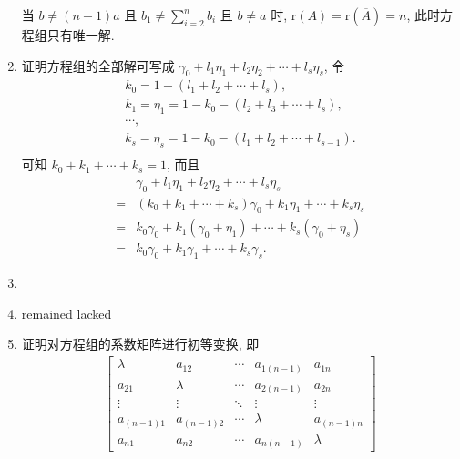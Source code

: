 \documentclass[a4paper, 11pt]{ctexart}
\newcommand{\rank}{\mathrm{r}}
\begin{document}
\begin{enumerate}
        当 $b \ne (n-1)a$ 且 $b_1 \ne \sum_{i=2}^nb_i$ 且 $b \ne a$ 时, $\rank(A) = \rank(\overline{A}) = n$, 此时方程组只有唯一解.
    \item %
        {\heiti 证明}\quad 方程组的全部解可写成 $\gamma_0 + l_1\eta_1 + l_2\eta_2 + \cdots + l_s\eta_s$, 令
        \begin{gather*}
            k_0 = 1 - (l_1 + l_2 + \cdots + l_s), \\
            k_1 = \eta_1 = 1 - k_0 - (l_2 + l_3 + \cdots + l_s), \\
            \cdots, \\
            k_s = \eta_s = 1 - k_0 - (l_1 + l_2 + \cdots + l_{s-1}). \\
        \end{gather*}
        可知 $k_0 + k_1 + \cdots + k_s = 1$, 而且
        \begin{align*}
            & \gamma_0 + l_1\eta_1 + l_2\eta_2 + \cdots + l_s\eta_s \\
            ={} & (k_0 + k_1 + \cdots + k_s)\gamma_0 + k_1\eta_1 + \cdots + k_s\eta_s \\
            ={} & k_0\gamma_0 + k_1(\gamma_0 + \eta_1) + \cdots + k_s(\gamma_0 + \eta_s) \\
            ={} & k_0\gamma_0 + k_1\gamma_1 + \cdots + k_s\gamma_s.   
        \end{align*}
    \item %
    \item %
        {\color{red} remained lacked}
    \item %
        {\heiti 证明}\quad 对方程组的系数矩阵进行初等变换, 即
        \begin{gather*}
            \begin{bmatrix}
                \lambda & a_{12} & \cdots & a_{1(n-1)} & a_{1n} \\
                a_{21} & \lambda & \cdots & a_{2(n-1)} & a_{2n} \\
                \vdots & \vdots & \ddots & \vdots & \vdots \\ 
                a_{(n-1)1} & a_{(n-1)2} & \cdots & \lambda & a_{(n-1)n} \\
                a_{n1} & a_{n2} & \cdots & a_{n(n-1)} & \lambda     
            \end{bmatrix}
        \end{gather*}
\end{enumerate}
\end{document}
